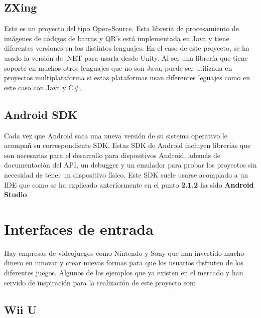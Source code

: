 \subsection{ZXing}
\label{cap2:subsec:zxing}

Este es un proyecto del tipo Open-Source. Esta libreria de procesamiento de im\'agenes de c\'odigos de barras y QR's est\'a implementada en Java y tiene diferentes versiones en los distintos lenguajes. En el caso de este proyecto, se ha usado la versi\'on de .NET para usarla desde Unity. Al ser una librer\'ia que tiene soporte en muchos otros lenguajes que no son Java, puede ser utilizada en proyectos multiplataforma si estas plataformas usan diferentes leguajes como en este caso con Java y C\#.


\subsection{Android SDK}
\label{cap2:subsec:android}

Cada vez que Android saca una nueva versi\'on de su sistema operativo le acompa\~n su correspondiente SDK. Estas SDK de Android incluyen librerias que son necesarias para el desarrollo para dispositivos Android, adem\'as de documentaci\'on del API, un debugger y un emulador para probar los proyectos sin necesidad de tener un dispositivo f\'isico. Este SDK suele usarse acomplado a un IDE que como se ha explicado anteriormente en el punto \textbf{2.1.2} ha sido \textbf{Android Studio}.

\section{Interfaces de entrada}

\label{cap2:sec:proyectos-similares}

Hay empresas de videojuegos como Nintendo y Sony que han invertido mucho dinero en innovar y crear nuevas formas para que los usuarios disfruten de los diferentes juegos. Algunos de los ejemplos que ya existen en el mercado y han servido de inspiraci\'on para la realizaci\'on de este proyecto son:

\subsection{Wii U}
\label{cap2:subsec:Wii U}

